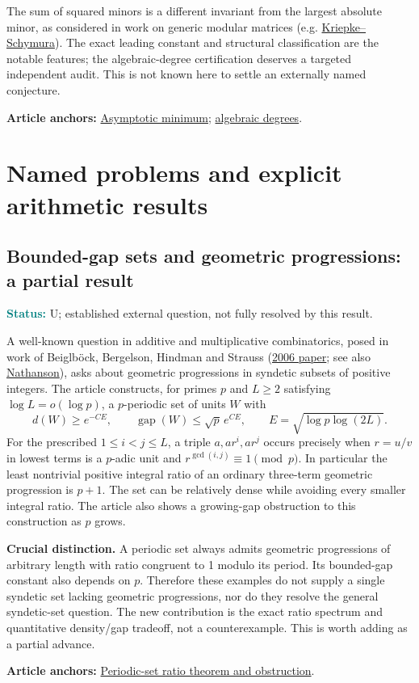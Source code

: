 \documentclass[11pt]{article}
\newcommand{\art}[3]{\href{https://github.com/VladimirReshetnikov/ProveIt/blob/3c4d27a69c98d09319a51e41a19fca05bb80a3e2/Analysis/GeneralizedRiemannHypothesis/Article/sections/#1.tex\#L#2}{#3}}
\newcommand{\status}[1]{\par\smallskip\noindent\textcolor{teal}{\textbf{Status:}} #1\par\smallskip}
\newcommand{\sources}[1]{\par\smallskip\noindent\textbf{Article anchors:} #1\par}
\begin{document}
The sum of squared minors is a different invariant from the largest absolute minor, as considered in work on generic modular matrices (e.g. \href{https://arxiv.org/abs/2502.15394}{Kriepke--Schymura}). The exact leading constant and structural classification are the notable features; the algebraic-degree certification deserves a targeted independent audit. This is not known here to settle an externally named conjecture.
\sources{\art{src}{571}{Asymptotic minimum}; \art{src}{725}{algebraic degrees}.}
\clearpage
\section{Named problems and explicit arithmetic results}\label{named}
\subsection{Bounded-gap sets and geometric progressions: a partial result}
\status{U; established external question, not fully resolved by this result.}
A well-known question in additive and multiplicative combinatorics, posed in work of Beiglb\"ock, Bergelson, Hindman and Strauss (\href{https://www.sciencedirect.com/science/article/pii/S0097316505002141}{2006 paper}; see also \href{https://doi.org/10.1007/s00013-020-01488-7}{Nathanson}), asks about geometric progressions in syndetic subsets of positive integers. The article constructs, for primes $p$ and $L\ge2$ satisfying $\log L=o(\log p)$, a $p$-periodic set of units $W$ with
\[
 d(W)\ge e^{-CE},\qquad \operatorname{gap}(W)\le\sqrt p\,e^{CE},\qquad
 E=\sqrt{\log p\log(2L)}.
\]
For the prescribed $1\le i<j\le L$, a triple $a,ar^i,ar^j$ occurs precisely when $r=u/v$ in lowest terms is a $p$-adic unit and $r^{\gcd(i,j)}\equiv1\pmod p$. In particular the least nontrivial positive integral ratio of an ordinary three-term geometric progression is $p+1$. The set can be relatively dense while avoiding every smaller integral ratio. The article also shows a growing-gap obstruction to this construction as $p$ grows.

\textbf{Crucial distinction.} A periodic set always admits geometric progressions of arbitrary length with ratio congruent to 1 modulo its period. Its bounded-gap constant also depends on $p$. Therefore these examples do not supply a single syndetic set lacking geometric progressions, nor do they resolve the general syndetic-set question. The new contribution is the exact ratio spectrum and quantitative density/gap tradeoff, not a counterexample. This is worth adding as a partial advance.
\sources{\art{gpp}{1368}{Periodic-set ratio theorem and obstruction}.}
\end{document}
